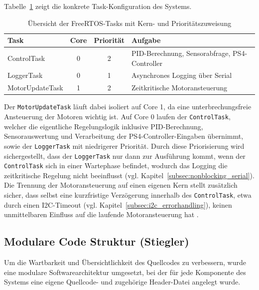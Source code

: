 \documentclass[fontsize=12pt,
parskip=half,	%
department=FakM,  %
logostyle=flat,
twoside, %
DIV=15,BCOR=10mm, %
]{OTHRreprt}
\begin{document}
Tabelle~\ref{tab:freertos_tasks} zeigt die konkrete Task-Konfiguration des Systems.

\begin{table}[H]
    \centering
    \caption{Übersicht der FreeRTOS-Tasks mit Kern- und Prioritätszuweisung}
    \label{tab:freertos_tasks}
    \begin{tabular}{|l|c|c|p{5.5cm}|}
        \hline
        \textbf{Task} & \textbf{Core} & \textbf{Priorität} & \textbf{Aufgabe} \\
        \hline
        ControlTask & 0 & 2 & PID-Berechnung, Sensorabfrage, PS4-Controller \\
        \hline
        LoggerTask & 0 & 1 & Asynchrones Logging über Serial \\
        \hline
        MotorUpdateTask & 1 & 2 & Zeitkritische Motoransteuerung \\
        \hline
    \end{tabular}
\end{table}

Der \texttt{MotorUpdateTask} läuft dabei isoliert auf Core 1, da eine un\-ter\-bre\-chungs\-freie Ansteuerung der Motoren wichtig ist. Auf Core 0 laufen der \texttt{ControlTask}, welcher die eigentliche Regelungslogik inklusive PID-Berechnung, Sensorauswertung und Verarbeitung der PS4-Controller-Eingaben übernimmt, sowie der \texttt{LoggerTask} mit niedrigerer Priorität. Durch diese Priorisierung wird sichergestellt, dass der \texttt{LoggerTask} nur dann zur Ausführung kommt, wenn der \texttt{ControlTask} sich in einer Wartephase befindet, wodurch das Logging die zeitkritische Regelung nicht beeinflusst (vgl. Kapitel~\ref{subsec:nonblocking_serial}). Die Trennung der Motoransteuerung auf einen eigenen Kern stellt zusätzlich sicher, dass selbst eine kurzfristige Verzögerung innerhalb des \texttt{ControlTask}, etwa durch einen I2C-Timeout (vgl. Kapitel~\ref{subsec:i2c_errorhandling}), keinen unmittelbaren Einfluss auf die laufende Motoransteuerung hat \cite{marwedel2021}.


\subsection{Modulare Code Struktur (Stiegler)}
\label{subsec:modulare_struktur}

Um die Wartbarkeit und Übersichtlichkeit des Quellcodes zu verbessern, wurde eine modulare Softwarearchitektur umgesetzt, bei der für jede Komponente des Systems eine eigene Quellcode- und zugehörige Header-Datei angelegt wurde.
\end{document}
